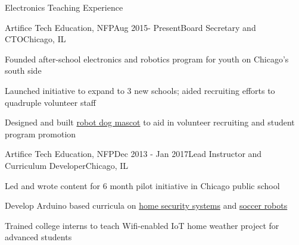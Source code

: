 \documentclass{resume} %
\begin{document}

\begin{rSection}{Electronics Teaching Experience}

\begin{rSubsection}{Artifice Tech Education, NFP}{Aug 2015- Present}{Board Secretary and CTO}{Chicago, IL}
	\item Founded after-school electronics and robotics program for youth on Chicago's south side
	\item Launched initiative to expand to 3 new schools; aided recruiting efforts to quadruple volunteer staff
	\item Designed and built \href{http://www.makeloft.org/2015/12/arfi-robotic-dog.html}{robot dog mascot} to aid in volunteer recruiting and student program promotion
	
\end{rSubsection}

\begin{rSubsection}{Artifice Tech Education, NFP}{Dec 2013 - Jan 2017}{Lead Instructor and Curriculum Developer}{Chicago, IL}
	\item Led and wrote content for 6 month pilot initiative in Chicago public school
	\item Develop Arduino based curricula on \href{http://www.makeloft.org/2014/12/raser-curriculum.html}{home security systems} and \href{http://blog.artificechicago.org/2016/05/bluetooth-redbot-tutorial.html}{soccer robots}
	\item Trained college interns to teach Wifi-enabled IoT home weather project for advanced students
	
\end{rSubsection}



\end{rSection}
\end{document}
